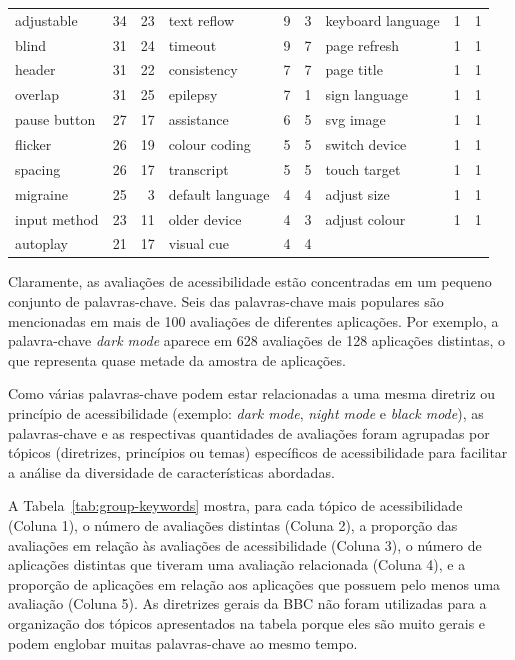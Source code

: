 \begin{table}[!htb]
\begin{tabular}{lrr||lrr||lrr}
adjustable       & 34      & 23   & text reflow      & 9       & 3    & keyboard language  & 1       & 1    \\
blind            & 31      & 24   & timeout          & 9       & 7    & page refresh       & 1       & 1    \\
header           & 31      & 22   & consistency      & 7       & 7    & page title         & 1       & 1    \\
overlap          & 31      & 25   & epilepsy         & 7       & 1    & sign language      & 1       & 1    \\
pause button     & 27      & 17   & assistance       & 6       & 5    & svg image          & 1       & 1    \\
flicker          & 26      & 19   & colour coding    & 5       & 5    & switch device      & 1       & 1    \\
spacing          & 26      & 17   & transcript       & 5       & 5    & touch target       & 1       & 1    \\
migraine         & 25      & 3    & default language & 4       & 4    & adjust size        & 1       & 1    \\
input method     & 23      & 11   & older device     & 4       & 3    & adjust colour      & 1       & 1    \\
autoplay         & 21      & 17   & visual cue       & 4       & 4    &                    &         &     \\
\hline
\end{tabular}
\end{table}

Claramente, as avaliações de acessibilidade estão concentradas em um pequeno conjunto de palavras-chave. Seis das palavras-chave mais populares são mencionadas em mais de 100 avaliações de diferentes aplicações. Por exemplo, a palavra-chave \textit{dark mode} aparece em 628 avaliações de 128 aplicações distintas, o que representa quase metade da amostra de aplicações.

Como várias palavras-chave podem estar relacionadas a uma mesma diretriz ou princípio de acessibilidade (exemplo: \textit{dark mode}, \textit{night mode} e \textit{black mode}), 
as palavras-chave e as respectivas quantidades de avaliações foram agrupadas por tópicos (diretrizes, princípios ou temas) específicos de acessibilidade para facilitar a análise da diversidade de características abordadas.

A Tabela~\ref{tab:group-keywords} mostra, para cada tópico de acessibilidade (Coluna 1), o número de avaliações distintas (Coluna 2), a proporção das avaliações em relação às avaliações de acessibilidade (Coluna 3), o número de aplicações distintas que tiveram uma avaliação relacionada (Coluna 4), e a proporção de aplicações em relação aos aplicações que possuem pelo menos uma avaliação (Coluna 5).
As diretrizes gerais da BBC não foram utilizadas para a organização dos tópicos apresentados na tabela porque eles são muito gerais e podem englobar muitas palavras-chave ao mesmo tempo.

